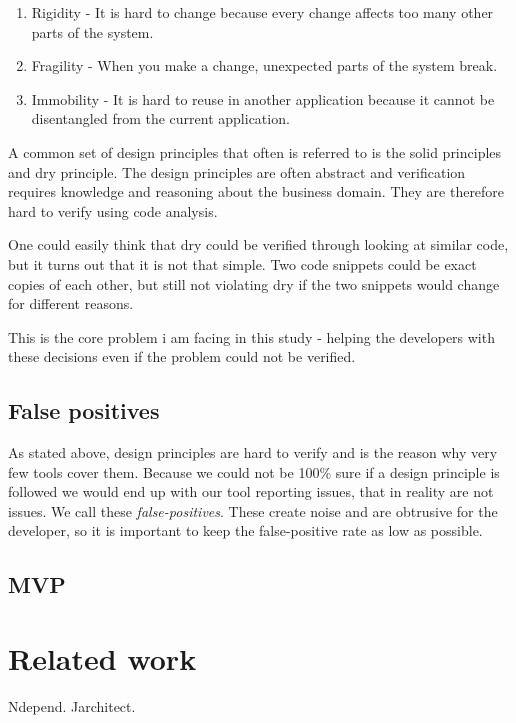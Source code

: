 \documentclass{article}
\begin{document}
\begin{enumerate}
	\item Rigidity - It is hard to change because every change affects too many other parts of the system.
	\item Fragility - When you make a change, unexpected parts of the system break.
	\item Immobility - It is hard to reuse in another application because it cannot be disentangled from the current application.
\end{enumerate}

A common set of design principles that often is referred to is the \gls{solid} principles and \gls{dry} principle. The design principles are often abstract and verification requires knowledge and reasoning about the business domain. They are therefore hard to verify using code analysis. 



One could easily think that \gls{dry} could be verified through looking at similar code, but it turns out that it is not that simple. Two code snippets could be exact copies of each other, but still not violating \gls{dry} if the two snippets would change for different reasons. 

This is the core problem i am facing in this study - helping the developers with these decisions even if the problem could not be verified.


\subsection{False positives}
As stated above, design principles are hard to verify and is the reason why very few tools cover them. Because we could not be 100\% sure if a design principle is followed we would end up with our tool reporting issues, that in reality are not issues. We call these \textit{false-positives}. These create noise and are obtrusive for the developer, so it is important to keep the false-positive rate as low as possible.


\subsection{MVP}

\section{Related work}
\label{relatedwork}
Ndepend. Jarchitect. 
\end{document}
